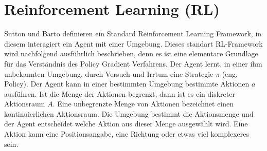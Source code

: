 \documentclass[conference]{IEEEtran}
\begin{document}



\section{Reinforcement Learning (RL)}
Sutton und Barto \cite{sutton_barto_12} definieren ein Standard Reinforcement Learning Framework, in diesem interagiert ein Agent mit einer Umgebung. Dieses standart RL-Framework wird nachfolgend ausführlich beschrieben, denn es ist eine elementare Grundlage für das Verständnis des Policy Gradient Verfahrens. Der Agent lernt, in einer ihm unbekannten Umgebung, durch Versuch und Irrtum eine Strategie $\pi$ (eng. Policy). Der Agent kann in einer bestimmten Umgebung bestimmte Aktionen $a$ ausführen. Ist die Menge der Aktionen begrenzt, dann ist es ein diskreter Aktionsraum $A$. Eine unbegrenzte Menge von Aktionen bezeichnet einen kontinuierlichen Aktionsraum. Die Umgebung bestimmt die Aktionsmenge und der Agent entscheidet welche Aktion aus dieser Menge ausgewählt wird. Eine Aktion kann eine Positionsangabe, eine Richtung oder etwas viel komplexeres sein. 
\end{document}
